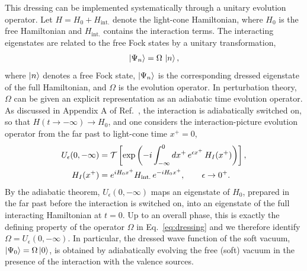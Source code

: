 \documentclass[a4paper,11pt]{article}
\begin{document}
This dressing can be implemented systematically through a unitary evolution operator. Let $H = H_{0} + H_{\text{int.}}$ denote the light-cone Hamiltonian, where $H_{0}$ is the free Hamiltonian and $H_{\text{int.}}$ contains the interaction terms. The interacting eigenstates are related to the free Fock states by a unitary transformation,
\begin{align}\label{eq:dressing}
\ket{\Psi_{n}} = \Omega\,\ket{n},
\end{align}
where $\ket{n}$ denotes a free Fock state, $\ket{\Psi_{n}}$ is the corresponding dressed eigenstate of the full Hamiltonian, and $\Omega$ is the evolution operator. In perturbation theory, $\Omega$ can be given an explicit representation as an adiabatic time evolution operator. As discussed in Appendix A of Ref.~\cite{kovner2019entanglement}, the interaction is adiabatically switched on, so that $H(t \rightarrow -\infty)\rightarrow H_{0}$, and one considers {\color{chg}the interaction-picture evolution operator from the far past to light-cone time $x^{+}=0$,
\begin{align} \label{eq:3.7}
U_{\epsilon}(0,-\infty)&=\mathcal{T}\left[\exp\left(-i\int_{-\infty}^{0}dx^{+}\,e^{\epsilon x^{+}}\,H_{I}(x^{+})\right)\right],\notag\\ H_{I}(x^{+})&=e^{iH_{0}x^{+}}H_{\text{int.}}\,e^{-iH_{0}x^{+}},\qquad \epsilon\rightarrow0^{+}.
\end{align}}
By the adiabatic theorem, {\color{chg}$U_{\epsilon}(0,-\infty)$} maps an eigenstate of $H_{0}$, prepared in the far past before the interaction is switched on, into an eigenstate of the full interacting Hamiltonian at $t=0$. Up to an overall phase, this is exactly the defining property of the operator $\Omega$ in Eq.~\eqref{eq:dressing} and we therefore identify {\color{chg}$\Omega = U_{\epsilon}(0,-\infty)$}. In particular, the dressed wave function of the soft vacuum, $\ket{\Psi_{0}} = \Omega\ket{0}$, is obtained by adiabatically evolving the free (soft) vacuum in the presence of the interaction with the valence sources.
\end{document}
